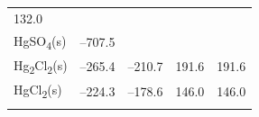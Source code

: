 \documentclass[
  9pt,
]{extbook}
\theoremstyle{definition}
\theoremstyle{definition}
\theoremstyle{definition}
\theoremstyle{remark}
\begin{document}
\begin{longtable}[]{@{}lllll@{}}
\begin{minipage}[t]{0.18\columnwidth}
132.0\strut
\end{minipage}\tabularnewline
\begin{minipage}[t]{0.10\columnwidth}\raggedright
HgSO\textsubscript{4}(s)\strut
\end{minipage} & \begin{minipage}[t]{0.19\columnwidth}\raggedright
--707.5\strut
\end{minipage} & \begin{minipage}[t]{0.20\columnwidth}\raggedright
\strut
\end{minipage} & \begin{minipage}[t]{0.18\columnwidth}\raggedright
\strut
\end{minipage} & \begin{minipage}[t]{0.18\columnwidth}\raggedright
\strut
\end{minipage}\tabularnewline
\begin{minipage}[t]{0.10\columnwidth}\raggedright
Hg\textsubscript{2}Cl\textsubscript{2}(s)\strut
\end{minipage} & \begin{minipage}[t]{0.19\columnwidth}\raggedright
--265.4\strut
\end{minipage} & \begin{minipage}[t]{0.20\columnwidth}\raggedright
--210.7\strut
\end{minipage} & \begin{minipage}[t]{0.18\columnwidth}\raggedright
191.6\strut
\end{minipage} & \begin{minipage}[t]{0.18\columnwidth}\raggedright
191.6\strut
\end{minipage}\tabularnewline
\begin{minipage}[t]{0.10\columnwidth}\raggedright
HgCl\textsubscript{2}(s)\strut
\end{minipage} & \begin{minipage}[t]{0.19\columnwidth}\raggedright
--224.3\strut
\end{minipage} & \begin{minipage}[t]{0.20\columnwidth}\raggedright
--178.6\strut
\end{minipage} & \begin{minipage}[t]{0.18\columnwidth}\raggedright
146.0\strut
\end{minipage} & \begin{minipage}[t]{0.18\columnwidth}\raggedright
146.0\strut
\end{minipage}\tabularnewline
\begin{minipage}[t]{0.10\columnwidth}\raggedright

\end{minipage}
\end{longtable}
\end{document}

